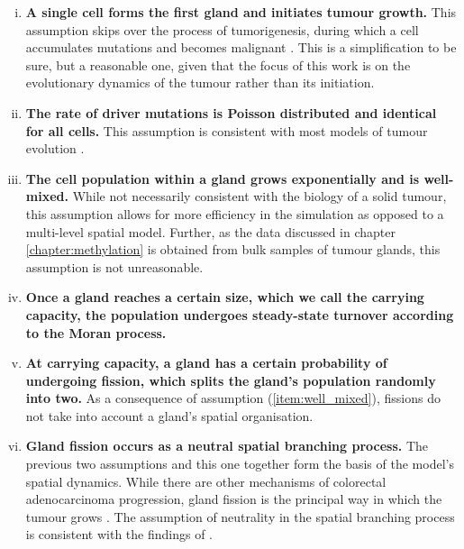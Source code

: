 \begin{enumerate}[(i)]
    \item \textbf{A single cell forms the first gland and initiates tumour growth.} This assumption skips
        over the process of tumorigenesis, during which a cell accumulates mutations and becomes
        malignant \cite{tariq_colorectal_2016}. This is a simplification to be sure, but a reasonable one,
        given that the focus of this work is on the evolutionary dynamics of the tumour rather than its
        initiation.
    \item \textbf{The rate of driver mutations is Poisson distributed and identical for all cells.} This
        assumption is consistent with most models of tumour evolution \cite{niida_modeling_2021}.
    \item \textbf{The cell population within a gland grows exponentially and is well-mixed.} While not necessarily
        consistent with the biology of a solid tumour, this assumption allows for more efficiency in the simulation
        as opposed to a multi-level spatial model. Further, as the data discussed in chapter \ref{chapter:methylation}
        is obtained from bulk samples of tumour glands, this assumption is not unreasonable. \label{item:well_mixed}
    \item \textbf{Once a gland reaches a certain size, which we call the carrying capacity, the population undergoes
        steady-state turnover according to the Moran process.}
    \item \textbf{At carrying capacity, a gland has a certain probability of undergoing fission, which splits the
        gland's population randomly into two.} As a consequence of assumption (\ref{item:well_mixed}), fissions do not
        take into account a gland's spatial organisation.
    \item \textbf{Gland fission occurs as a neutral spatial branching process.} The previous two assumptions and this
        one together form the basis of the model's spatial dynamics. While there are other mechanisms of colorectal
        adenocarcinoma progression, gland fission is the principal way in which the tumour grows \cite{preston_bottom-up_2003}.
        The assumption of neutrality in the spatial branching process is consistent with the findings of \cite{sottoriva_big_2015}.
\end{enumerate}

